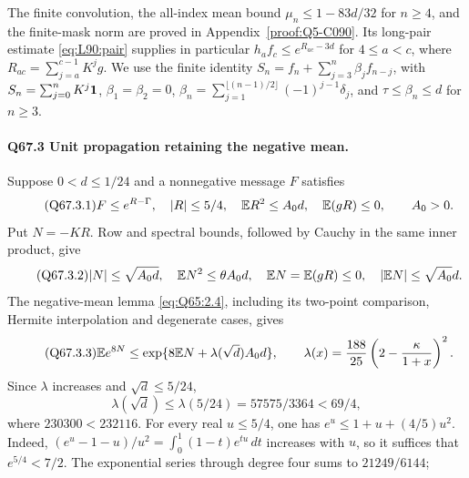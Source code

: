 The finite convolution, the all-index mean bound
\(\mu_n\le\allowbreak 1-83d/32\) for \(n\ge\allowbreak 4\), and the finite-mask norm are
proved in Appendix~\ref{proof:Q5-C090}.
Its long-pair estimate \eqref{eq:L90:pair} supplies in particular
\(h_af_c\le\allowbreak  e^{R_{ac}-3d}\) for \(4\le\allowbreak  a<\allowbreak c\), where
\(R_{ac}=\allowbreak \sum_{j=\allowbreak a}^{c-1}K^jg\).
We use the finite identity
\(S_n=\allowbreak f_n+\sum_{j=\allowbreak 3}^n\beta_jf_{n-j}\), with
\(S_n=\allowbreak \sum_{j=\allowbreak 0}^nK^j\mathbf1\),
\(\beta_1=\allowbreak \beta_2=\allowbreak 0\),
\(\beta_n=\allowbreak \sum_{j=\allowbreak 1}^{\lfloor(n-1)/2\rfloor}(-1)^{j-1}\delta_j\),
and \(\tau\le\allowbreak \beta_n\le\allowbreak  d\) for \(n\ge\allowbreak 3\).

\paragraph{Q67.3 Unit propagation retaining the negative mean.}
Suppose \(0<\allowbreak d\le\allowbreak 1/24\) and a nonnegative message \(F\) satisfies
\begin{equation}\tag{Q67.3.1}\label{eq:Q67:3.1}
F\le e^{R-\Gamma},\quad |R|\le5/4,\quad
\mathbb E R^2\le A_0d,\quad\mathbb E(gR)\le0,\qquad A_0>0.
\end{equation}
Put \(N=\allowbreak -KR\). Row and spectral bounds, followed by Cauchy in the
same inner product, give
\begin{equation}\tag{Q67.3.2}\label{eq:Q67:3.2}
|N|\le\sqrt{A_0d},\quad \mathbb E N^2\le\theta A_0d,\quad
\mathbb E N=\mathbb E(gR)\le0,\quad|\mathbb E N|\le\sqrt{A_0}d.
\end{equation}
The negative-mean lemma \eqref{eq:Q65:2.4}, including its two-point
comparison, Hermite interpolation and degenerate cases, gives
\begin{equation}\tag{Q67.3.3}\label{eq:Q67:3.3}
\mathbb E e^{8N}\le\exp\{8\mathbb E N+\lambda(\sqrt d)A_0d\},\qquad
\lambda(x)=\frac{188}{25}\left(2-\frac{\kappa}{1+x}\right)^2.
\end{equation}
Since \(\lambda\) increases and \(\sqrt d\le\allowbreak 5/24\),
\begin{equation}\tag{Q67.3.4}\label{eq:Q67:3.4}
\lambda(\sqrt d)\le\lambda(5/24)=57575/3364<69/4,
\end{equation}
where \(230300<\allowbreak 232116\).
For every real \(u\le\allowbreak 5/4\), one has \(e^u\le\allowbreak 1+u+(4/5)u^2\).
Indeed,
\((e^u-1-u)/u^2=\allowbreak \int_0^1(1-t)e^{tu}\,\allowbreak dt\) increases with \(u\),
so it suffices that \(e^{5/4}<\allowbreak 7/2\).
The exponential series through degree four sums to \(21249/6144\);
